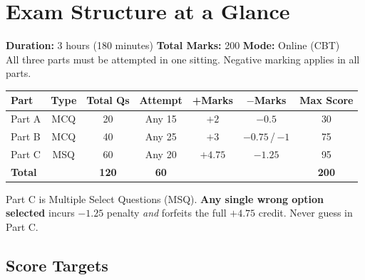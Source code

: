 \documentclass[12pt,a4paper]{article}
\begin{document}
\pagecolor{white}
\color{black}
\newpage

\tableofcontents
\newpage

\section{Exam Structure at a Glance}

\begin{alertblue}
\small
\textbf{Duration:} 3 hours (180 minutes) \quad
\textbf{Total Marks:} 200 \quad
\textbf{Mode:} Online (CBT)\\[4pt]
All three parts must be attempted in one sitting. Negative marking applies in all parts.
\end{alertblue}

\vspace{8pt}

\begin{center}
\begin{tabular}{@{}lcccccc@{}}
\toprule
\rowcolor{bluelight}
\textbf{Part} & \textbf{Type} & \textbf{Total Qs} & \textbf{Attempt} & \textbf{+Marks} & \textbf{$-$Marks} & \textbf{Max Score} \\
\midrule
Part A & MCQ & 20 & Any 15 & $+2$ & $-0.5$ & 30 \\
Part B & MCQ & 40 & Any 25 & $+3$ & $-0.75$\,/\,$-1$ & 75 \\
Part C & MSQ & 60 & Any 20 & $+4.75$ & $-1.25$ & 95 \\
\midrule
\rowcolor{bluelight}
\textbf{Total} & & \textbf{120} & \textbf{60} & & & \textbf{200} \\
\bottomrule
\end{tabular}
\end{center}

\vspace{6pt}
\begin{alertamber}
\small Part C is Multiple Select Questions (MSQ). \textbf{Any single wrong option selected} incurs $-1.25$ penalty \emph{and} forfeits the full $+4.75$ credit. Never guess in Part C.
\end{alertamber}

\subsection{Score Targets}
\end{document}
